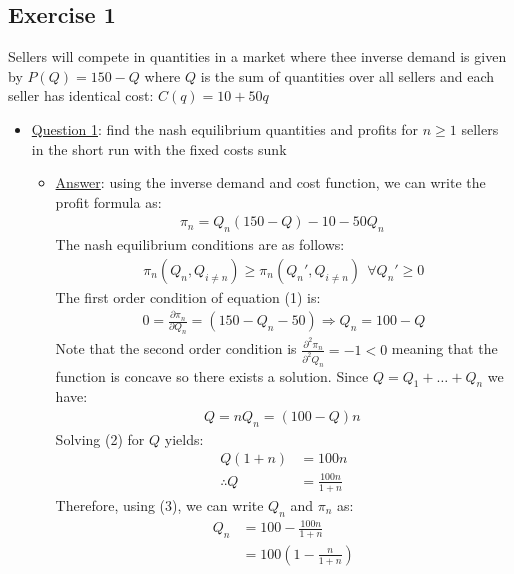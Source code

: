 \documentclass{article}
\begin{document}
\subsection{Exercise 1}
 Sellers will compete in quantities in a market where thee inverse demand is given by $P(Q) = 150 - Q$ where $Q$ is the sum of quantities over all sellers and each seller has identical cost: $C(q) = 10 + 50q$ \par \vspace{0.3em}
  \begin{itemize}
    \item  \underline{Question 1}: find the nash equilibrium quantities and profits for $n \geq 1$ sellers in the short run with the fixed costs sunk
    \begin{itemize}
      \item  \underline{Answer}: using the inverse demand and cost function, we can write the profit formula as:
      \begin{gather*}
        \pi_{n} = Q_{n}(150 - Q) - 10 - 50Q_{n} \ \tag{1}
      \end{gather*}
      The nash equilibrium conditions are as follows:
      \begin{gather*}
        \pi_{n}(Q_{n}, Q_{i \neq n}) \geq \pi_{n}(Q_{n}', Q_{i \neq n}) \ \ \forall Q_{n}' \geq 0
      \end{gather*}
      The first order condition of equation (1) is:
      \begin{gather*}
        0 = \frac{\partial \pi_{n}}{\partial Q_{n}} = (150 - Q_{n} - 50) \Rightarrow Q_{n} = 100 - Q
      \end{gather*}
      Note that the second order condition is $\tfrac{\partial^{2} \pi_{n}}{\partial^{2} Q_{n}} = -1 < 0$ meaning that the function is concave so there exists a solution. Since $Q = Q_{1} + \dots + Q_{n}$ we have:
      \begin{gather*}
        Q = n Q_{n} = (100 - Q)n \ \tag{2}
      \end{gather*}
      Solving (2) for $Q$ yields:
      \begin{align*}
        Q(1+n) &= 100n \\
        \therefore Q &= \frac{100n}{1+n} \ \tag{3}
      \end{align*}
      Therefore, using (3), we can write $Q_{n}$ and $\pi_{n}$ as:
      \begin{align*}
        Q_{n} &= 100 - \frac{100n}{1 + n} \\
        &= 100 (1 - \frac{n}{1 + n}) \\

\end{align*}
\end{itemize}
\end{itemize}
\end{document}
